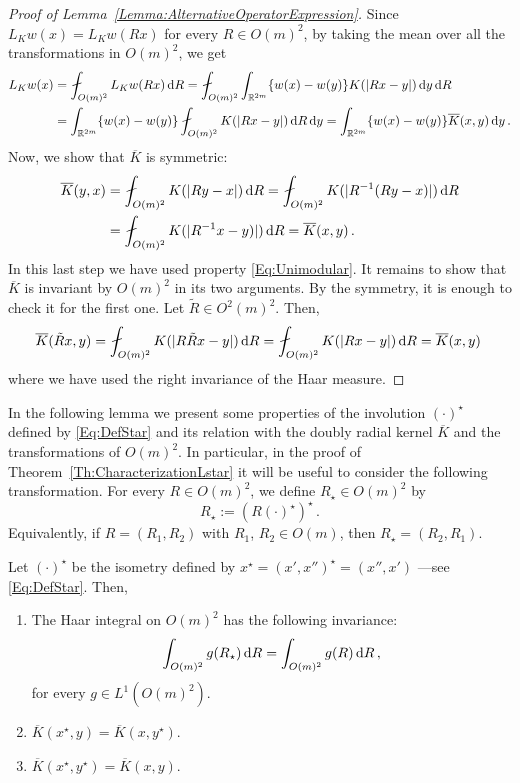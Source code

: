 \begin{proof}[Proof of Lemma~\ref{Lemma:AlternativeOperatorExpression}]
Since $L_K w (x) = L_K w (Rx)$ for every $R\in O(m)^2$, by taking the mean over all the transformations in $O(m)^2$, we get
\begin{align*}
L_K w(x) &= \average_{O(m)^2} L_K w(Rx)\d R =  \average_{O(m)^2} \int_{\R^{2m}} \{w(x) - w(y)\}K(|Rx - y|) \d y \d R\\
&= \int_{\R^{2m}} \{w(x) - w(y)\}  \average_{O(m)^2} K(|Rx - y|) \d R  \d y = \int_{\R^{2m}} \{w(x) - w(y)\}  \overline{K}(x,y) \d y\,.
\end{align*}
Now, we show that $\overline{K}$ is symmetric:
\begin{align*}
\overline{K}(y,x) &= \average_{O(m)^2} K(|R y - x|)\d R = \average_{O(m)^2} K(|R^{-1} (R y - x)|)\d R \\
&= \average_{O(m)^2} K(|R^{-1}x-y)|)\d R = \overline{K}(x,y)\,.
\end{align*}
In this last step we have used property \eqref{Eq:Unimodular}. It remains to show that
$\overline{K}$ is invariant by $O(m)^2$ in its two arguments. By the symmetry, it is enough to
check it for the first one. Let $\tilde{R} \in O^2(m)^2$. Then,
$$
\overline{K} (\tilde{R}x, y) = \average_{O(m)^2} K(|R \tilde{R} x - y|)\d R  = \average_{O(m)^2} K(|R x - y|)\d R = \overline{K} (x, y)\,
$$
where we have used the right invariance of the Haar measure.
\end{proof}



In the following lemma we present some properties of the involution $(\cdot)^\star$ defined by \eqref{Eq:DefStar} and its relation with the doubly radial kernel $\overline{K}$ and the transformations of $O(m)^2$. In particular, in the proof of Theorem~\ref{Th:CharacterizationLstar} it will be useful to consider the following transformation. For every $R\in O(m)^2$, we define  $R_\star\in O(m)^2$ by 
\begin{equation}
	\label{Eq:DefRStar}
	R_\star := (R(\cdot)^\star)^\star\,.
\end{equation}
Equivalently, if $R = (R_1, R_2)$ with $R_1$, $R_2 \in O(m)$, then $R_\star = (R_2, R_1)$.

\begin{lemma}
\label{Lemma:PropertiesStar}
Let $(\cdot)^\star$ be the isometry defined by $x^\star = (x',x'')^\star = (x'', x')$
---see \eqref{Eq:DefStar}.
Then,
\begin{enumerate}
\item
The Haar integral on $O(m)^2$ has the following invariance:
\begin{equation}
\label{Eq:InvarianceByStar}
\int_{O(m)^2} g(R_\star) \,\mathrm{d} R = \int_{O(m)^2} g(R) \,\mathrm{d} R \,,
\end{equation}
for every $g \in L^1(O(m)^2)$.
\item $\overline{K}(x^\star,y) = \overline{K} (x,y^\star)$.
\item $\overline{K}(x^\star,y^\star) = \overline{K} (x,y)$.
\end{enumerate}
\end{lemma}


